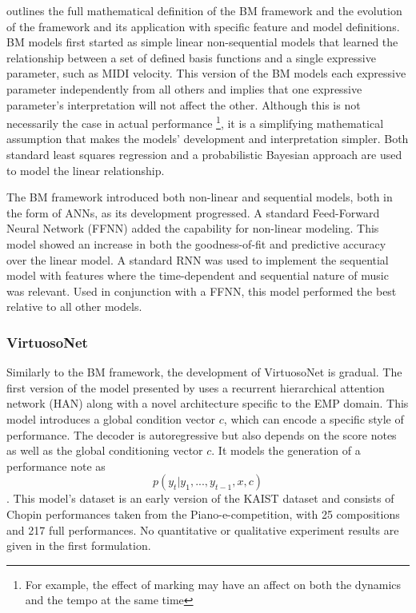 \citet{eduardo2018computational} outlines the full mathematical definition of the BM framework and the evolution of the framework and its application with specific feature and model definitions. BM models first started as simple linear non-sequential models that learned the relationship between a set of defined basis functions and a single expressive parameter, such as MIDI velocity. This version of the BM models each expressive parameter independently from all others and implies that one expressive parameter's interpretation will not affect the other. Although this is not necessarily the case in actual performance \footnote{For example, the effect of  marking may have an affect on both the dynamics and the tempo at the same time}, it is a simplifying mathematical assumption that makes the models' development and interpretation simpler. Both standard least squares regression and a probabilistic Bayesian approach are used to model the linear relationship. 

The BM framework introduced both non-linear and sequential models, both in the form of ANNs, as its development progressed. A standard Feed-Forward Neural Network (FFNN) added the capability for non-linear modeling. This model showed an increase in both the goodness-of-fit and predictive accuracy over the linear model. A standard RNN was used to implement the sequential model with features where the time-dependent and sequential nature of music was relevant. Used in conjunction with a FFNN, this model performed the best relative to all other models.

\newcommand{\vnet}{VirtuosoNet}
\subsubsection{\vnet{}}
Similarly to the BM framework, the development of \vnet{} is gradual. The first version of the model presented by \citet{jeong2018virtuosonet} uses a recurrent hierarchical attention network (HAN) along with a novel \ed{} architecture specific to the EMP domain. This model introduces a global condition vector $c$, which can encode a specific style of performance. The decoder is autoregressive but also depends on the score notes as well as the global conditioning vector $c$. It models the generation of a performance note as $$p(y_t \vert y_1, ..., y_{t-1}, x, c)$$. This model's dataset is an early version of the KAIST dataset and consists of Chopin performances taken from the Piano-e-competition, with 25 compositions and 217 full performances. No quantitative or qualitative experiment results are given in the first formulation. 

